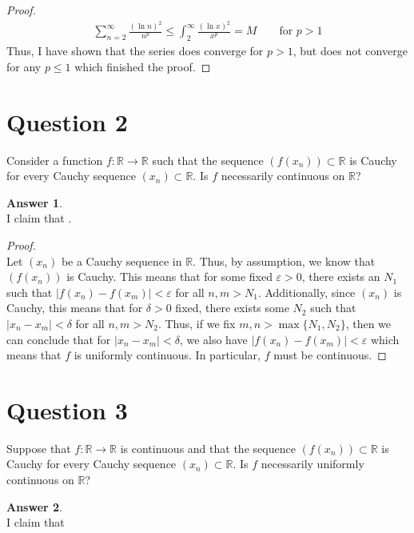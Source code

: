 \documentclass[10pt,a4paper]{article}
\theoremstyle{definition}
\newtheorem*{answer*}{Answer}
\begin{document}
\begin{proof}{$ $}
\begin{align*}
\sum_{n = 2}^{\infty} \frac{(\ln n)^2}{n^p} \leq \int_2^{\infty} \frac{(\ln x)^2}{x^p} = M \quad \quad \text{for $p > 1$}
\end{align*}
Thus, I have shown that the series does converge for $p > 1$, but does not converge for any $p \leq 1$ which finished the proof. 
\end{proof}

\newpage

\section*{Question 2}
Consider a function $f: \mathbb{R} \to \mathbb{R}$ such that the sequence $(f(x_n)) \subset \mathbb{R}$ is Cauchy for every Cauchy sequence $(x_n) \subset \mathbb{R}$. Is $f$ necessarily continuous on $\mathbb{R}$?

\begin{answer*}{$ $}
\\I claim that .
\end{answer*}

\begin{proof}{$ $}
\\Let $(x_n)$ be a Cauchy sequence in $\mathbb{R}$. Thus, by assumption, we know that $(f(x_n))$ is Cauchy. This means that for some fixed $\varepsilon > 0$, there exists an $N_1$ such that $|f(x_n) - f(x_m)| < \varepsilon$ for all $n,m > N_1$. Additionally, since $(x_n)$ is Cauchy, this means that for $\delta > 0$ fixed, there exists some $N_2$ such that $|x_n - x_m| < \delta$ for all $n,m > N_2$. Thus, if we fix $m, n > \max\{N_1, N_2\}$, then we can conclude that for $|x_n - x_m| < \delta$, we also have $|f(x_n) - f(x_m)| < \varepsilon$ which means that $f$ is uniformly continuous. In particular, $f$ must be continuous. 

\end{proof}


\newpage

\section*{Question 3}
Suppose that $f: \mathbb{R} \to \mathbb{R}$ is continuous and that the sequence $(f(x_n)) \subset \mathbb{R}$ is Cauchy for every Cauchy sequence $(x_n) \subset \mathbb{R}$. Is $f$ necessarily uniformly continuous on $\mathbb{R}$?

\begin{answer*}{$ $}
\\I claim that 
\end{answer*}
\end{document}
